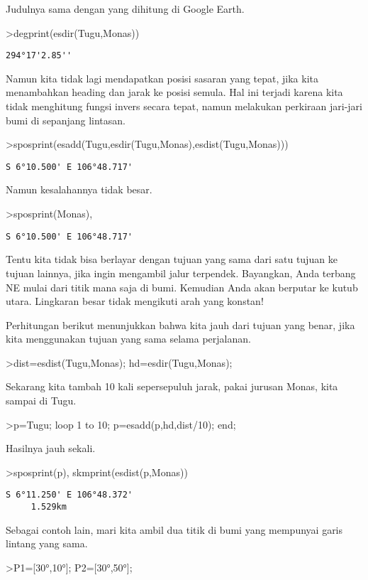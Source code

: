 \documentclass[
]{book}
\begin{document}
Judulnya sama dengan yang dihitung di Google Earth.

\textgreater degprint(esdir(Tugu,Monas))

\begin{verbatim}
294°17'2.85''
\end{verbatim}

Namun kita tidak lagi mendapatkan posisi sasaran yang tepat, jika kita menambahkan heading dan jarak ke posisi semula. Hal ini terjadi karena kita tidak menghitung fungsi invers secara tepat, namun melakukan perkiraan jari-jari bumi di sepanjang lintasan.

\textgreater sposprint(esadd(Tugu,esdir(Tugu,Monas),esdist(Tugu,Monas)))

\begin{verbatim}
S 6°10.500' E 106°48.717'
\end{verbatim}

Namun kesalahannya tidak besar.

\textgreater sposprint(Monas),

\begin{verbatim}
S 6°10.500' E 106°48.717'
\end{verbatim}

Tentu kita tidak bisa berlayar dengan tujuan yang sama dari satu tujuan ke tujuan lainnya, jika ingin mengambil jalur terpendek. Bayangkan, Anda terbang NE mulai dari titik mana saja di bumi. Kemudian Anda akan berputar ke kutub utara. Lingkaran besar tidak mengikuti arah yang konstan!

Perhitungan berikut menunjukkan bahwa kita jauh dari tujuan yang benar, jika kita menggunakan tujuan yang sama selama perjalanan.

\textgreater dist=esdist(Tugu,Monas); hd=esdir(Tugu,Monas);

Sekarang kita tambah 10 kali sepersepuluh jarak, pakai jurusan Monas, kita sampai di Tugu.

\textgreater p=Tugu; loop 1 to 10; p=esadd(p,hd,dist/10); end;

Hasilnya jauh sekali.

\textgreater sposprint(p), skmprint(esdist(p,Monas))

\begin{verbatim}
S 6°11.250' E 106°48.372'
     1.529km
\end{verbatim}

Sebagai contoh lain, mari kita ambil dua titik di bumi yang mempunyai garis lintang yang sama.

\textgreater P1={[}30°,10°{]}; P2={[}30°,50°{]};
\end{document}
